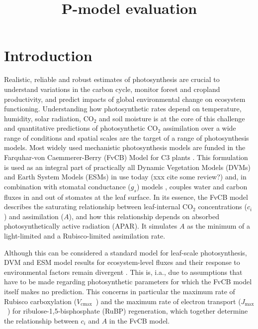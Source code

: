 \documentclass{myreport}
\newcommand{\vcmax}{$V_{\text{cmax}}$}
\newcommand{\jmax}{$J_{\text{max}}$}
\begin{document}
\pagestyle{headings}

% 

\title{P-model evaluation}

\maketitle

\tableofcontents

\section{Introduction}

Realistic, reliable and robust estimates of photosynthesis are crucial to understand variations in the carbon cycle, monitor forest and cropland productivity, and predict impacts of global environmental change on ecosystem functioning. Understanding how photosynthetic rates depend on temperature, humidity, solar radiation, CO$_2$ and soil moisture is at the core of this challenge and quantitative predictions of photosynthetic CO$_2$ assimilation over a wide range of conditions and spatial scales are the target of a range of photosynthesis models. Most widely used mechanistic photosynthesis models are funded in the Farquhar-von Caemmerer-Berry (FvCB) Model for C3 plants \citep{farquhar80, voncaemmerer81}. This formulation is used as an integral part of practically all Dynamic Vegetation Models (DVMs) and Earth System Models (ESMs) in use today (xxx cite some review?) and, in combination with stomatal conductance ($g_s$) models \citep{ball87, leuning95pce, medlyn11gcb}, couples water and carbon fluxes in and out of stomates at the leaf surface. In its essence, the FvCB model describes the saturating relationship between leaf-internal CO$_2$ concentrations ($c_i$) and assimilation ($A$), and how this relationship depends on absorbed photosynthetically active radiation (APAR). It simulates $A$ as the minimum of a light-limited and a Rubisco-limited assimilation rate. 

Although this can be considered a standard model for leaf-scale photosynthesis, DVM and ESM model results for ecosystem-level fluxes and their response to environmental factors remain divergent \citep{rogers17}. This is, i.a., due to assumptions that have to be made regarding photosynthetic parameters for which the FvCB model itself makes no prediction. This concerns in particular the maximum rate of Rubisco carboxylation (\vcmax\ ) and the maximum rate of electron transport (\jmax\ ) for ribulose-1,5-bisphosphate (RuBP) regeneration, which together determine the relationship between $c_i$ and $A$ in the FvCB model. 
\end{document}
